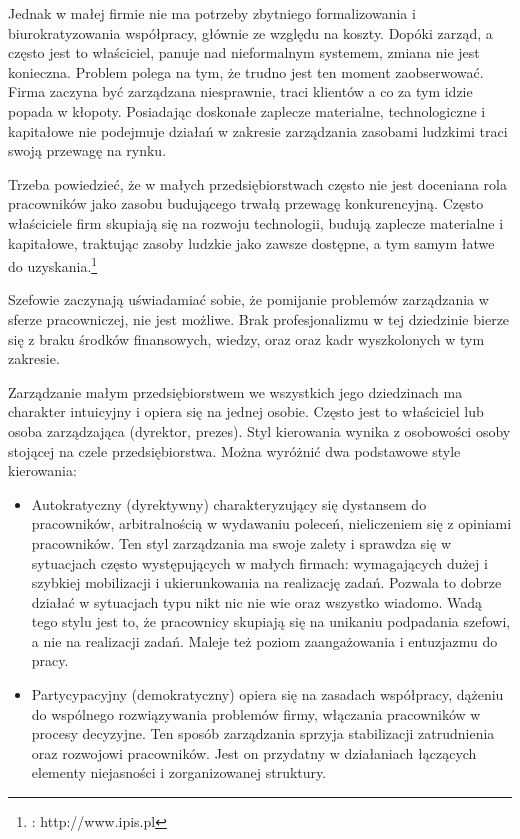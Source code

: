 Jednak w małej firmie nie ma potrzeby zbytniego formalizowania i biurokratyzowania współpracy, głównie ze względu na koszty. Dopóki zarząd, a często jest to właściciel, panuje nad nieformalnym systemem, zmiana nie jest konieczna. Problem polega na tym, że trudno jest ten moment zaobserwować. Firma zaczyna być zarządzana niesprawnie, traci klientów a co za tym idzie popada w kłopoty. Posiadając doskonałe zaplecze materialne, technologiczne i kapitałowe nie podejmuje działań w zakresie zarządzania zasobami ludzkimi traci swoją przewagę na rynku.

Trzeba powiedzieć, że w małych przedsiębiorstwach często nie jest doceniana rola pracowników jako zasobu budującego trwałą przewagę konkurencyjną. Często właściciele firm skupiają się na rozwoju technologii, budują zaplecze materialne i kapitałowe, traktując zasoby ludzkie jako zawsze dostępne, a tym samym łatwe do uzyskania.\footnote{\cite{ipis}: http://www.ipis.pl}

Szefowie zaczynają uświadamiać sobie, że pomijanie problemów zarządzania w sferze pracowniczej, nie jest możliwe. Brak profesjonalizmu w tej dziedzinie bierze się z braku środków finansowych, wiedzy, oraz oraz kadr wyszkolonych w tym zakresie.

Zarządzanie małym przedsiębiorstwem we wszystkich jego dziedzinach ma charakter intuicyjny i opiera się na jednej osobie. Często jest to właściciel lub osoba zarządzająca (dyrektor, prezes). Styl kierowania wynika z osobowości osoby stojącej na czele przedsiębiorstwa. Można wyróżnić dwa podstawowe style kierowania:

\begin{itemize}
\item Autokratyczny (dyrektywny) charakteryzujący się dystansem do pracowników, arbitralnością w wydawaniu poleceń, nieliczeniem się z opiniami pracowników. Ten styl zarządzania ma swoje zalety i sprawdza się w sytuacjach często występujących w małych firmach: wymagających dużej i szybkiej mobilizacji i ukierunkowania na realizację zadań. Pozwala to dobrze działać w sytuacjach typu nikt nic nie wie oraz wszystko wiadomo. Wadą tego stylu jest to, że pracownicy skupiają się na unikaniu podpadania szefowi, a nie na realizacji zadań. Maleje też poziom  zaangażowania i entuzjazmu do pracy.

\item Partycypacyjny (demokratyczny) opiera się na zasadach współpracy, dążeniu do wspólnego rozwiązywania problemów firmy, włączania pracowników w procesy decyzyjne. Ten sposób zarządzania sprzyja stabilizacji zatrudnienia oraz rozwojowi pracowników. Jest on przydatny w działaniach łączących elementy niejasności i zorganizowanej struktury.
\end{itemize}

